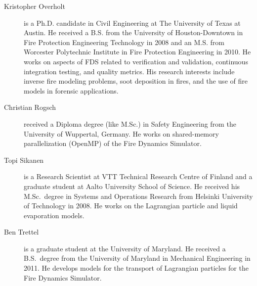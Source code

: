 \begin{description}
\item[Kristopher Overholt] is a Ph.D. candidate in Civil Engineering at The University of Texas at Austin. He received a B.S. from the University of Houston-Downtown in Fire Protection Engineering Technology in 2008 and an M.S. from Worcester Polytechnic Institute in Fire Protection Engineering in 2010. He works on aspects of FDS related to verification and validation, continuous integration testing, and quality metrics. His research interests include inverse fire modeling problems, soot deposition in fires, and the use of fire models in forensic applications.

\item[Christian Rogsch] received a Diploma degree (like M.Sc.) in Safety Engineering from the University of Wuppertal, Germany. He works on shared-memory parallelization (OpenMP) of the Fire Dynamics Simulator.

\item[Topi Sikanen] is a Research Scientist at VTT Technical Research Centre of Finland and a graduate student at Aalto University School of Science. He received his M.Sc.~degree in Systems and Operations Research from Helsinki University of Technology in 2008. He works on the Lagrangian particle and liquid evaporation models.

\item[Ben Trettel] is a graduate student at the University of Maryland. He received a B.S.~degree from the University of Maryland in Mechanical Engineering in 2011. He develops models for the transport of Lagrangian particles for the Fire Dynamics Simulator.



\end{description}


